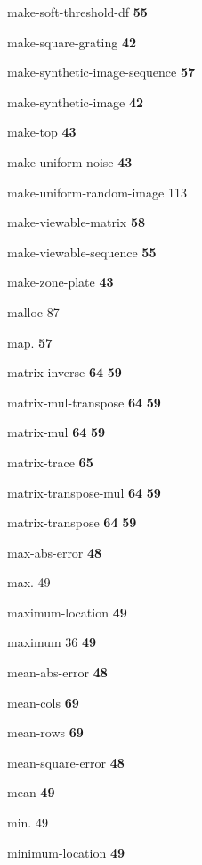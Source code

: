\begin{theindex}
\item {\ptt make-soft-threshold-df} {\bf 55}
\item {\ptt make-square-grating} {\bf 42}
\item {\ptt make-synthetic-image-sequence} {\bf 57}
\item {\ptt make-synthetic-image} {\bf 42}
\item {\ptt make-top} {\bf 43}
\item {\ptt make-uniform-noise} {\bf 43}
\item {\ptt make-uniform-random-image} 113
\item {\ptt make-viewable-matrix} {\bf 58}
\item {\ptt make-viewable-sequence} {\bf 55}
\item {\ptt make-zone-plate} {\bf 43}
\item {\ptt malloc} 87
\item {\ptt map.} {\bf 57}
\item {\ptt matrix-inverse}
 {\bf 64}
 {\bf 59}
\item {\ptt matrix-mul-transpose}
 {\bf 64}
 {\bf 59}
\item {\ptt matrix-mul}
 {\bf 64}
 {\bf 59}
\item {\ptt matrix-trace} {\bf 65}
\item {\ptt matrix-transpose-mul} {\bf 64}
 {\bf 59}
\item {\ptt matrix-transpose}
 {\bf 64}
 {\bf 59}
\item {\ptt max-abs-error} {\bf 48}
\item {\ptt max.} 49
\item {\ptt maximum-location}
 {\bf 49}
\item {\ptt maximum} 36
 {\bf 49}
\item {\ptt mean-abs-error} {\bf 48}
\item {\ptt mean-cols} {\bf 69}
\item {\ptt mean-rows} {\bf 69}
\item {\ptt mean-square-error} {\bf 48}
\item {\ptt mean}
 {\bf 49}
\item {\ptt min.} 49
\item {\ptt minimum-location}
 {\bf 49}

\end{theindex}
